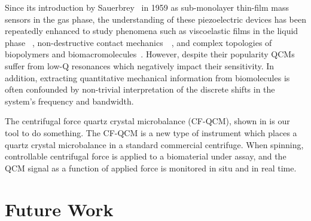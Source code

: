 Since its introduction by Sauerbrey~\cite{sauerbrey1959verwendung} in 1959
as sub-monolayer thin-film mass sensors in the gas phase, the understanding
of these piezoelectric devices has been repeatedly enhanced to study
phenomena such as viscoelastic films in the liquid
phase~\cite{kanazawa1985frequency} , non-destructive contact
mechanics~\cite{borovsky2001measuring}~\cite{johannsman2007contacts}, and
complex topologies of biopolymers and
biomacromolecules~\cite{marx2003quartz}. However, despite their popularity
QCMs suffer from low-Q resonances which negatively impact their
sensitivity. In addition, extracting quantitative mechanical information
from biomolecules is often confounded by non-trivial interpretation of the
discrete shifts in the system's frequency and bandwidth.

The centrifugal force quartz crystal microbalance (CF-QCM), shown in
 is our tool to do something.  The CF-QCM is a new type
of instrument which places a quartz crystal microbalance in a standard
commercial centrifuge.  When spinning, controllable centrifugal force is
applied to a biomaterial under assay, and the QCM signal as a function of
applied force is monitored in situ and in real time.

\chapter{Future Work}

